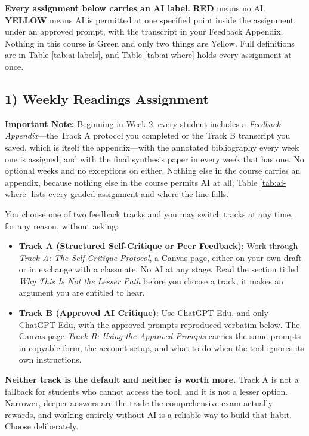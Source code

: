 \documentclass[11pt]{article}     %
\begin{document}
\noindent \textbf{Every assignment below carries an AI label.} \textbf{RED} means no AI. \textbf{YELLOW} means AI is permitted at one specified point inside the assignment, under an approved prompt, with the transcript in your Feedback Appendix. Nothing in this course is Green and only two things are Yellow. Full definitions are in Table \ref{tab:ai-labels}, and Table \ref{tab:ai-where} holds every assignment at once.

\subsection*{1) Weekly Readings Assignment}

\textbf{Important Note:} Beginning in Week 2, every student includes a \emph{Feedback Appendix}---the Track A protocol you completed or the Track B transcript you saved, which is itself the appendix---with the annotated bibliography every week one is assigned, and with the final synthesis paper in every week that has one. No optional weeks and no exceptions on either. Nothing else in the course carries an appendix, because nothing else in the course permits AI at all; Table \ref{tab:ai-where} lists every graded assignment and where the line falls.

You choose one of two feedback tracks and you may switch tracks at any time, for any reason, without asking:

\begin{itemize}
    \item \textbf{Track A (Structured Self-Critique or Peer Feedback)}: Work through \emph{Track A: The Self-Critique Protocol}, a Canvas page, either on your own draft or in exchange with a classmate. No AI at any stage. Read the section titled \emph{Why This Is Not the Lesser Path} before you choose a track; it makes an argument you are entitled to hear.
    \item \textbf{Track B (Approved AI Critique)}: Use ChatGPT Edu, and only ChatGPT Edu, with the approved prompts reproduced verbatim below. The Canvas page \emph{Track B: Using the Approved Prompts} carries the same prompts in copyable form, the account setup, and what to do when the tool ignores its own instructions.
\end{itemize}

\noindent \textbf{Neither track is the default and neither is worth more.} Track A is not a fallback for students who cannot access the tool, and it is not a lesser option. Narrower, deeper answers are the trade the comprehensive exam actually rewards, and working entirely without AI is a reliable way to build that habit. Choose deliberately.
\end{document}
